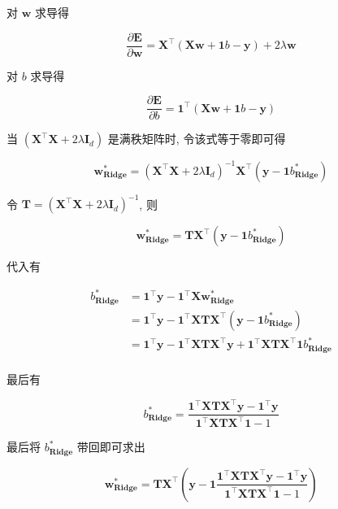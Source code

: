 \documentclass[answers]{exam}  %
\begin{document}
\begin{questions}
\begin{solution}
\begin{enumerate}
            对 $\bm{w}$ 求导得

            $$
              \frac{\partial \bm{E}}{\partial \bm{w}} = \bm{X}^{\top}(\bm{X}\bm{w}+\bm{1}b-\bm{y}) + 2\lambda \bm{w}
            $$

            对 $b$ 求导得

            $$
              \frac{\partial \bm{E}}{\partial b} = \bm{1}^{\top}(\bm{X}\bm{w}+\bm{1}b-\bm{y})
            $$

            当 $(\bm{X}^{\top}\bm{X}+2\lambda \bm{I}_d)$ 是满秩矩阵时, 令该式等于零即可得

            $$
              \bm{w}^{*}_{\mathbf{Ridge}} = (\bm{X}^{\top}\bm{X}+2\lambda \bm{I}_d)^{-1}\bm{X}^{\top}(\bm{y}-\bm{1}b^{*}_{\mathbf{Ridge}})
            $$

            令 $\bm{T} = (\bm{X}^{\top}\bm{X}+2\lambda \bm{I}_d)^{-1}$, 则

            $$
              \bm{w}^{*}_{\mathbf{Ridge}} = \bm{T}\bm{X}^{\top}(\bm{y}-\bm{1}b^{*}_{\mathbf{Ridge}})
            $$

            代入有

            $$
              \begin{aligned}
                b^{*}_{\mathbf{Ridge}}
                 & = \bm{1}^{\top}\bm{y} - \bm{1}^{\top}\bm{X}\bm{w}^{*}_{\mathbf{Ridge}}                                                                    \\
                 & = \bm{1}^{\top}\bm{y} - \bm{1}^{\top}\bm{X}\bm{T}\bm{X}^{\top}(\bm{y}-\bm{1}b^{*}_{\mathbf{Ridge}})                                       \\
                 & = \bm{1}^{\top}\bm{y} - \bm{1}^{\top}\bm{X}\bm{T}\bm{X}^{\top}\bm{y} + \bm{1}^{\top}\bm{X}\bm{T}\bm{X}^{\top}\bm{1}b^{*}_{\mathbf{Ridge}} \\
              \end{aligned}
            $$

            最后有

            $$
              b^{*}_{\mathbf{Ridge}} = \frac{\bm{1}^{\top}\bm{X}\bm{T}\bm{X}^{\top}\bm{y} - \bm{1}^{\top}\bm{y}}{\bm{1}^{\top}\bm{X}\bm{T}\bm{X}^{\top}\bm{1} - 1}
            $$

            最后将 $b^{*}_{\mathbf{Ridge}}$ 带回即可求出

            $$
              \bm{w}^{*}_{\mathbf{Ridge}} = \bm{T}\bm{X}^{\top}(\bm{y}-\bm{1}\frac{\bm{1}^{\top}\bm{X}\bm{T}\bm{X}^{\top}\bm{y} - \bm{1}^{\top}\bm{y}}{\bm{1}^{\top}\bm{X}\bm{T}\bm{X}^{\top}\bm{1} - 1})
            $$


\end{enumerate}
\end{solution}
\end{questions}
\end{document}
